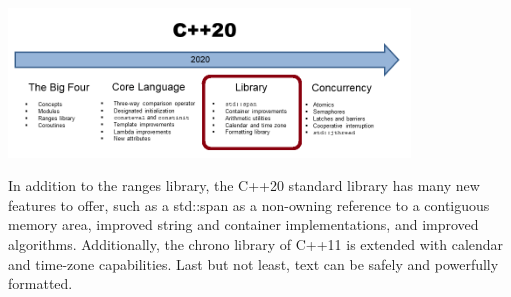 
\begin{center}
\includegraphics[width=0.8\textwidth]{content/3/chapter5/images/1.png}\\
\end{center}

In addition to the ranges library, the C++20 standard library has many new features to offer, such as a std::span as a non-owning reference to a contiguous memory area, improved string and container implementations, and improved algorithms. Additionally, the chrono library of C++11 is extended with calendar and time-zone capabilities. Last but not least, text can be safely and powerfully formatted.